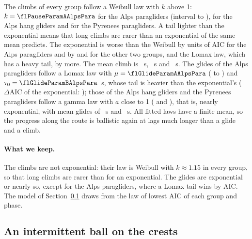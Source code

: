 The climbs of every group follow a Weibull law with $k$ above 1: $k = \flPauseParamAAlpsPara$ for the Alps paragliders (interval
\flPauseParamAAlpsParaLo{} to \flPauseParamAAlpsParaHi), \flPauseParamAAlpsHang{} for the Alps hang gliders and
\flPauseParamAPyrPara{} for the Pyrenees paragliders. A tail lighter than the exponential means that long climbs are rarer than
an exponential of the same mean predicts. The exponential is worse than the Weibull by \flPauseAicExpAlpsPara{} units of AIC for the
Alps paragliders and by \flPauseAicExpAlpsHang{} and \flPauseAicExpPyrPara{} for the other two groups, and the Lomax law, which
has a heavy tail, by more. The mean climb is \flPauseMeanAlpsPara~s, \flPauseMeanAlpsHang~s and \flPauseMeanPyrPara~s. The glides
of the Alps paragliders follow a Lomax law with $\mu = \flGlideParamAAlpsPara$ (\flGlideParamAAlpsParaLo{} to \flGlideParamAAlpsParaHi)
and $\tau_0 = \flGlideParamBAlpsPara$~s, whose tail is heavier than the exponential's ($\Delta\mathrm{AIC}$ of the exponential:
\flGlideAicExpAlpsPara); those of the Alps hang gliders and the Pyrenees paragliders follow a gamma law with $a$ close to
1 (\flGlideParamAAlpsHang{} and \flGlideParamAPyrPara), that is, nearly exponential, with mean glides of \flGlideMeanAlpsHang~s and
\flGlideMeanPyrPara~s. All fitted laws have a finite mean, so the progress along the route is ballistic again at lags much longer
than a glide and a climb.

\paragraph{What we keep.} The climbs are not exponential: their law is Weibull with $k \approx 1.15$ in every group, so that
long climbs are rarer than for an exponential. The glides are exponential or nearly so, except for the Alps paragliders, where
a Lomax tail wins by AIC. The model of Section~\ref{sec:flmodel} draws from the law of lowest AIC of each group and phase.

\subsection{An intermittent ball on the crests}\label{sec:flmodel}

